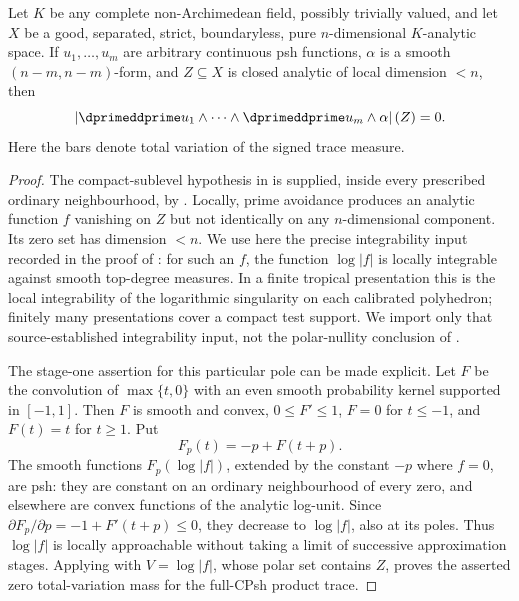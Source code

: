 \begin{corollary}
\label{cor:ch16-cpsh-analytic-nullity}
Let $K$ be any complete non-Archimedean field, possibly trivially valued,
and let $X$ be a good, separated, strict, boundaryless, pure
$n$-dimensional $K$-analytic space.  If $u_1,\ldots,u_m$ are arbitrary
continuous psh functions, $\alpha$ is a smooth $(n-m,n-m)$-form, and
$Z\subseteq X$ is closed analytic of local dimension $<n$, then
\[
 \left|
  \dprimeddprime u_1\wedge\cdots\wedge\dprimeddprime u_m\wedge\alpha
 \right|(Z)=0.
\]
Here the bars denote total variation of the signed trace measure.
\end{corollary}

\begin{proof}
The compact-sublevel hypothesis in
 is supplied, inside every prescribed
ordinary neighbourhood, by .  Locally, prime
avoidance produces an analytic function $f$ vanishing on $Z$ but not
identically on any $n$-dimensional component.  Its zero set has dimension
$<n$.  We use here the precise integrability input recorded in the proof of
\cite[Corollary~16.9.4]{CLD25}: for such an $f$, the function $\log|f|$ is
locally integrable against smooth top-degree measures.  In a finite tropical
presentation this is the local integrability of the logarithmic singularity
on each calibrated polyhedron; finitely many presentations cover a compact
test support.  We import only that source-established integrability input,
not the polar-nullity conclusion of
\cite[Corollary~16.9.4]{CLD25}.

The stage-one assertion for this particular pole can be made explicit.  Let
$F$ be the convolution of $\max\{t,0\}$ with an even smooth probability
kernel supported in $[-1,1]$.  Then $F$ is smooth and convex,
$0\leq F'\leq1$, $F=0$ for $t\leq-1$, and $F(t)=t$ for $t\geq1$.  Put
\[
                         F_p(t)=-p+F(t+p).
\]
The smooth functions $F_p(\log|f|)$, extended by the constant $-p$ where
$f=0$, are psh: they are constant on an ordinary neighbourhood of every zero,
and elsewhere are convex functions of the analytic log-unit.  Since
$\partial F_p/\partial p=-1+F'(t+p)\leq0$, they decrease to $\log|f|$,
also at its poles.  Thus $\log|f|$ is locally approachable without taking a
limit of successive approximation stages.  Applying
 with $V=\log|f|$, whose polar set contains
$Z$, proves the asserted zero total-variation mass for the full-CPsh product
trace.
\end{proof}

